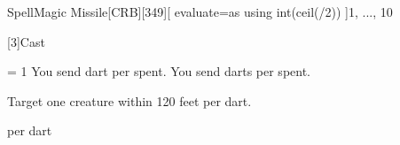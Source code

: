 
\begin{card-collection}{Spell}{\level}{Magic Missile}[CRB][349]{[
  evaluate=\level as \half using int(ceil(\level/2))
]\level}{1, ..., 10}



[3]{Cast}

\ifnum \half = 1
You send \half{} dart per  spent.
\else
You send \half{} darts per  spent.
\fi

Target one creature within 120 feet per dart.

 per dart
\end{card-collection}